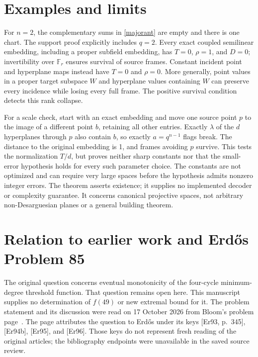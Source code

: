 \documentclass[11pt]{article}
\newcommand{\F}{\mathbb F}
\begin{document}
\section{Examples and limits}
For $n=2$, the complementary sums in \eqref{majorant} are empty and
there is one chart. The support proof explicitly includes $q=2$.
Every exact coupled semilinear embedding, including a proper subfield
embedding, has $T=0$, $\rho=1$, and $D=0$; invertibility over $\F_r$
ensures survival of source frames.
Constant incident point and hyperplane maps instead have $T=0$ and
$\rho=0$. More generally, point values in a proper target subspace
$W$ and hyperplane values containing $W$ can preserve every incidence
while losing every full frame. The positive survival condition detects
this rank collapse.

For a scale check, start with an exact embedding and move one source
point $p$ to the image of a different point $b$, retaining all other
entries. Exactly $\lambda$ of the $d$ hyperplanes through $p$ also
contain $b$, so exactly $a=q^{n-1}$ flags break. The distance to the
original embedding is 1, and frames avoiding $p$ survive. This tests
the normalization $T/d$, but proves neither sharp constants nor that
the small-error hypothesis holds for every such parameter choice.
The constants are not optimized and can require very large spaces
before the hypothesis admits nonzero integer errors. The theorem
asserts existence; it supplies no implemented decoder or complexity
guarantee. It concerns canonical projective spaces, not arbitrary
non-Desarguesian planes or a general building theorem.

\section{Relation to earlier work and Erd\H{o}s Problem 85}
The original question concerns eventual monotonicity of the four-cycle
minimum-degree threshold function. That question remains open here.
This manuscript supplies no determination of $f(49)$ or new extremal
bound for it. The problem statement and its discussion were read on
17 October 2026 from Bloom's problem page~\cite{problem}. The page
attributes the question to Erd\H{o}s under its keys [Er93, p.~345],
[Er94b], [Er95], and [Er96]. Those keys do not represent fresh reading
of the original articles; the bibliography endpoints were unavailable
in the saved source review.
\end{document}
